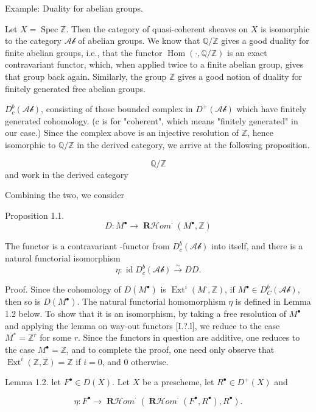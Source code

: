 \documentclass[12pt]{book}
\newcommand{\cat}[1]{\mathcal{#1}}
\DeclareMathOperator{\Hom}{Hom}
\DeclareMathOperator{\Ext}{Ext}
\DeclareMathOperator{\id}{id}
\DeclareMathOperator{\RHom}{\mathbf{R}\mathcal{H}\textit{om}}
\begin{document}
\setcounter{page}{254}
Example: Duality for abelian groups.

Let \(X=\operatorname{Spec}\mathbb{Z}\). Then the category of quasi-coherent sheaves on \(X\) is isomorphic to the category \(\cat{Ab}\) of abelian groups. We know that \(\mathbb{Q}/\mathbb{Z}\) gives a good duality for finite abelian groups, i.e., that the functor \(\Hom(\cdot,\mathbb{Q}/\mathbb{Z})\) is an exact contravariant functor, which, when applied twice to a finite abelian group, gives that group back again. Similarly, the group \(\mathbb{Z}\) gives a good notion of duality for finitely generated free abelian groups.

\(D_{c}^{b}(\cat{Ab})\), consisting of those bounded complex in \(D^{+}(\cat{Ab})\) which have finitely generated cohomology. (c is for "coherent", which means "finitely generated" in our case.) Since the complex above is an injective resolution of \(\mathbb{Z}\), hence isomorphic to \(\mathbb{Q}/\mathbb{Z}\) in the derived category, we arrive at the following proposition.

\[
\mathbb{Q}/\mathbb{Z}
\]
and work in the derived category

Combining the two, we consider

Proposition 1.1.
\[
D: M^{\bullet} \to \RHom^{\cdot}\left(M^{\bullet}, \mathbb{Z}\right)
\]

\setcounter{page}{255}
The functor is a contravariant -functor from \(D_{c}^{b}(\cat{Ab})\) into itself, and there is a natural functorial isomorphism
\[
\eta: \id D_{c}^{b}(\cat{Ab}) \stackrel{\sim}{\to} DD .
\]

Proof. Since the cohomology of \(D(M^{\bullet})\) is \(\Ext^{i}(M^{\cdot}, \mathbb{Z})\), if \(M^{\bullet} \in D_{C}^{b}(\cat{Ab})\), then so is \(D(M^{\bullet})\). The natural functorial homomorphism \(\eta\) is defined in Lemma 1.2 below. To show that it is an isomorphism, by taking a free resolution of \(M^{\bullet}\) and applying the lemma on way-out functors [I.?.l], we reduce to the case \(M^{*}=\mathbb{Z}^{r}\) for some \(r\). Since the functors in question are additive, one reduces to the case \(M^{\bullet}=\mathbb{Z}\), and to complete the proof, one need only observe that \(\Ext^{i}(\mathbb{Z}, \mathbb{Z})=\mathbb{Z}\) if \(i=0\), and \(0\) otherwise.

Lemma 1.2.
let \(F^{\bullet} \in D(X)\). Let \(X\) be a prescheme, let \(R^{\bullet} \in D^{+}(X)\) and

\[
\eta: F^{\bullet} \to \RHom^{\cdot}\left(\RHom^{\cdot}\left(F^{\bullet}, R^{\bullet}\right), R^{\bullet}\right) .
\]
\end{document}
